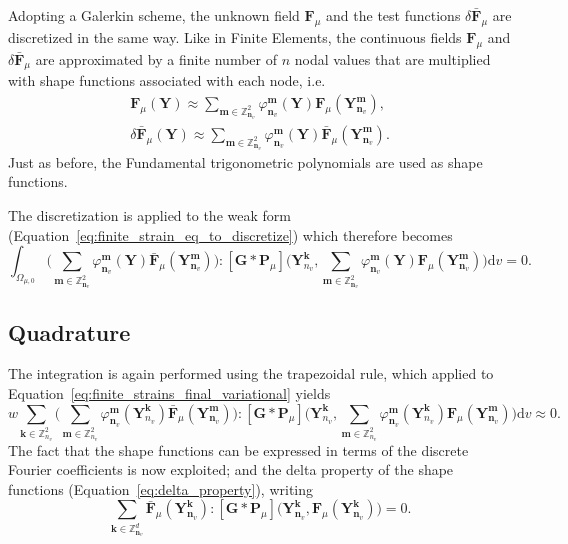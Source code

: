 Adopting a Galerkin scheme, the unknown field \(\bm{F}_\mu\) and the test functions \(\delta \bar{\bm{F}}_\mu\) are discretized in the same way.
Like in Finite Elements, the continuous fields \(\bm{F}_\mu\) and \(\delta \bar{\bm{F}}_\mu\) are approximated by a finite number of \(n\) nodal values that are multiplied with shape functions associated with each node, i.e.
\begin{gather}
\bm{F}_\mu(\bm Y)  \approx \sum_{\bm m\in\mathbb{Z}^2_{\bm n_v} } \varphi_{\bm n_v}^{\bm m}(\bm Y) \bm{F}_\mu (\bm Y^{\bm m}_{\bm n_v}), \\
\delta \bar{\bm{F}}_\mu(\bm Y) \approx \sum_{\bm m\in\mathbb{Z}^2_{\bm n_v} } \varphi_{\bm n_v}^{\bm m}(\bm Y) \bar{\bm{F}}_\mu (\bm Y^{\bm m}_{\bm n_v}).
\end{gather}
Just as before, the Fundamental trigonometric polynomials are used as shape functions.

The discretization is applied to the weak form (Equation~\eqref{eq:finite_strain_eq_to_discretize}) which therefore becomes
\begin{equation} \label{eq:finite_strains_final_variational}
\int_{\Omega_{\mu,0}} \Big(\sum_{\bm m\in\mathbb{Z}^2_{\bm n_v} } \varphi_{\bm n_v}^{\bm m}(\bm Y) \bar{\bm{F}}_\mu (\bm Y^{\bm m}_{\bm n_v})\Big):[\bm{G} * \bm{P}_\mu]\Big(\bm Y^{\bm k}_{n_v}, \sum_{\bm m\in\mathbb{Z}^2_{\bm n_v} } \varphi_{\bm n_v}^{\bm m}(\bm Y) \bm{F}_\mu (\bm Y^{\bm m}_{\bm n_v})\Big) \mathrm{d} v=0.
\end{equation}

\subsection{Quadrature}

The integration is again performed using the trapezoidal rule, which applied to Equation~\eqref{eq:finite_strains_final_variational} yields
\begin{equation}
w\sum_{\bm k\in\mathbb{Z}^2_{n_v}} \Big(\sum_{\bm m\in\mathbb{Z}^2_{n_v} } \varphi_{\bm n_v}^{\bm m}(\bm Y^{\bm k}_{n_v}) \bar{\bm{F}}_\mu (\bm Y^{\bm m}_{\bm n_v})\Big):[\bm{G} * \bm{P}_\mu]\Big(\bm Y^{\bm k}_{n_v},\sum_{\bm m\in\mathbb{Z}^2_{n_v} } \varphi_{\bm n_v}^{\bm m}(\bm Y^{\bm k}_{n_v}) \bm{F}_\mu (\bm Y^{\bm m}_{\bm n_v})\Big) \mathrm{d} v\approx 0.
\end{equation}
The fact that the shape functions can be expressed in terms of the discrete Fourier coefficients is now exploited; and the delta property of the shape functions (Equation~\eqref{eq:delta_property}), writing
\begin{equation} \label{eq:final_form_sum_finite_strain}
\sum_{\bm  k \in \mathbb{Z}_{\bm n_v}^{d}} \bar{\bm{F}}_\mu (\bm Y^{\bm k}_{\bm n_v}):[\bm G * \bm P_\mu]\Big(\bm Y_{\bm n_v}^{\bm k}, \bm{F}_\mu (\bm Y^{\bm k}_{\bm n_v})\Big)=0.
\end{equation}

